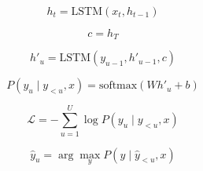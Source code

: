 
\begin{equation}
h_t = \text{LSTM}(x_t, h_{t-1})
\end{equation}

\begin{equation}
c = h_T
\end{equation}

\begin{equation}
h'_u = \text{LSTM}(y_{u-1}, h'_{u-1}, c)
\end{equation}

\begin{equation}
P(y_u \mid y_{<u}, x) = \text{softmax}(W h'_u + b)
\end{equation}

\begin{equation}
\mathcal{L} = -\sum_{u=1}^{U} \log P(y_u \mid y_{<u}, x)
\end{equation}

\begin{equation}
\hat{y}_u = \arg\max_{y} P(y \mid \hat{y}_{<u}, x)
\end{equation}